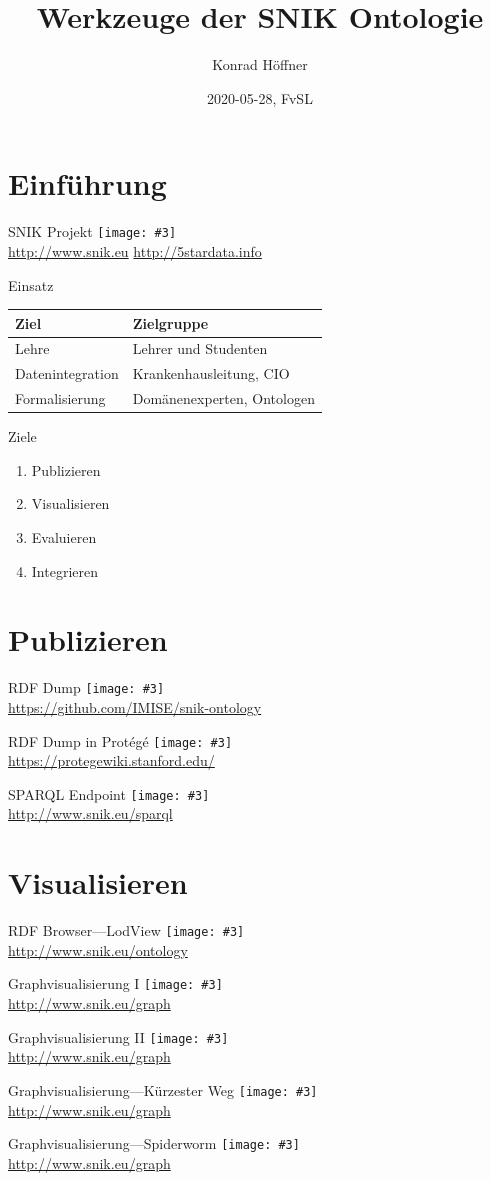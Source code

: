 \documentclass[aspectratio=43]{beamer}
\author{Konrad Höffner}
\date{2020-05-28, FvSL}
\title{Werkzeuge der SNIK Ontologie}
\newcommand{\imageslide}[3][]
{
\begin{frame}{#2}
\centering\texttt{[image: \#3]}
\\#1
\end{frame}
}
\begin{document}
\begin{frame}
\titlepage
\end{frame}

\section{Einführung}

\imageslide[\url{http://www.snik.eu} \url{http://5stardata.info}]{SNIK Projekt}{img/5star.png}

\begin{frame}{Einsatz}
\centering
\begin{tabular}{ll}
\toprule
\textbf{Ziel}	&\textbf{Zielgruppe}\\
\midrule
Lehre			&Lehrer und Studenten\\
Datenintegration	&Krankenhausleitung, CIO\\
Formalisierung		&Domänenexperten, Ontologen\\
\bottomrule
\end{tabular}
\end{frame}

\begin{frame}{Ziele}
\begin{enumerate}
\item Publizieren
\item Visualisieren
\item Evaluieren
\item Integrieren
\end{enumerate}
\end{frame}

\section{Publizieren}

\imageslide[\url{https://github.com/IMISE/snik-ontology}]{RDF Dump}{img/rdfdump.png}
\imageslide[\url{https://protegewiki.stanford.edu/}]{RDF Dump in Protégé}{img/protege.png}
\imageslide[\url{http://www.snik.eu/sparql}]{SPARQL Endpoint}{img/sparqlresult.png}

\section{Visualisieren}

\imageslide[\url{http://www.snik.eu/ontology}]{RDF Browser---LodView}{img/browse-cio.png}

\imageslide[\url{http://www.snik.eu/graph}]{Graphvisualisierung I}{img/graph-entitytype.png}
\imageslide[\url{http://www.snik.eu/graph}]{Graphvisualisierung II}{img/graph-erf.png}
\imageslide[\url{http://www.snik.eu/graph}]{Graphvisualisierung---Kürzester Weg}{img/shortestpath.png}
\imageslide[\url{http://www.snik.eu/graph}]{Graphvisualisierung---Spiderworm}{img/spiderworm.png}
\end{document}
